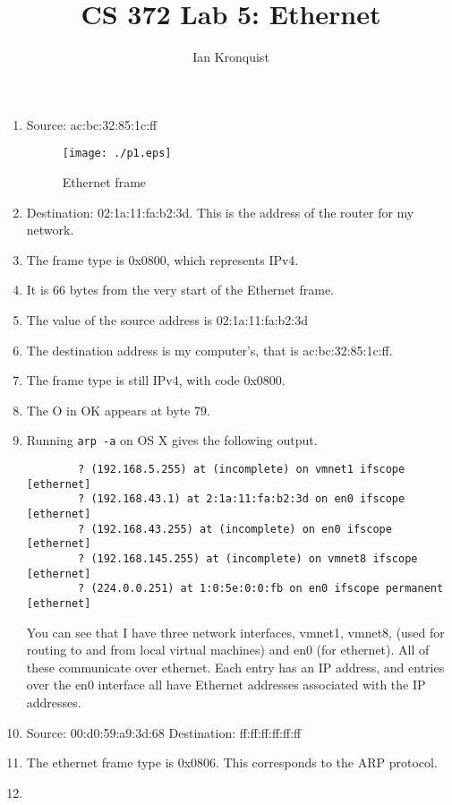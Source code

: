 \documentclass[12pt]{article}
\title{CS 372 Lab 5: Ethernet}
\author{Ian Kronquist}
\begin{document}
\maketitle

\begin{enumerate}
    \item Source: ac:bc:32:85:1c:ff
        \begin{figure}[!ht]
            \centering
            \texttt{[image: ./p1.eps]}
            \caption{Ethernet frame}
        \end{figure}
    \item Destination: 02:1a:11:fa:b2:3d. This is the address of the router for
        my network.
    \item The frame type is 0x0800, which represents IPv4.
    \item It is 66 bytes from the very start of the Ethernet frame.
    \item The value of the source address is 02:1a:11:fa:b2:3d
    \item The destination address is my computer's, that is ac:bc:32:85:1c:ff.
    \item The frame type is still IPv4, with code 0x0800.
    \item The O in OK appears at byte 79.
    \item Running \texttt{arp -a} on OS X gives the following output.
        \begin{verbatim}
        ? (192.168.5.255) at (incomplete) on vmnet1 ifscope [ethernet]
        ? (192.168.43.1) at 2:1a:11:fa:b2:3d on en0 ifscope [ethernet]
        ? (192.168.43.255) at (incomplete) on en0 ifscope [ethernet]
        ? (192.168.145.255) at (incomplete) on vmnet8 ifscope [ethernet]
        ? (224.0.0.251) at 1:0:5e:0:0:fb on en0 ifscope permanent [ethernet]
        \end{verbatim}
        You can see that I have three network interfaces, vmnet1, vmnet8, (used
        for routing to and from local virtual machines) and en0 (for ethernet).
        All of these communicate over ethernet. Each entry has an IP address,
        and entries over the en0 interface all have Ethernet addresses
        associated with the IP addresses.
    \item Source: 00:d0:59:a9:3d:68
        Destination: ff:ff:ff:ff:ff:ff
    \item The ethernet frame type is 0x0806. This corresponds to the ARP
        protocol.
    \item 
        \begin{enumerate}

\end{enumerate}
\end{enumerate}
\end{document}
